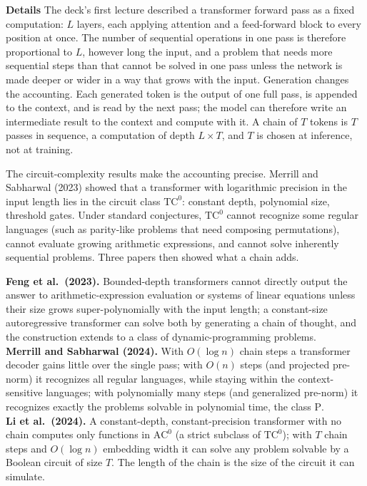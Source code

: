 \documentclass[11pt,letterpaper]{article}
\newcommand{\para}[1]{\medskip\noindent\textbf{#1}\quad}
\newenvironment{formulas}{\begin{tcolorbox}[formulabox]}{\end{tcolorbox}}
\begin{document}
\para{Details} The deck's first lecture described a transformer forward pass as a fixed computation: $L$ layers, each applying attention and a feed-forward block to every position at once. The number of sequential operations in one pass is therefore proportional to $L$, however long the input, and a problem that needs more sequential steps than that cannot be solved in one pass unless the network is made deeper or wider in a way that grows with the input. Generation changes the accounting. Each generated token is the output of one full pass, is appended to the context, and is read by the next pass; the model can therefore write an intermediate result to the context and compute with it. A chain of $T$ tokens is $T$ passes in sequence, a computation of depth $L \times T$, and $T$ is chosen at inference, not at training.

The circuit-complexity results make the accounting precise. Merrill and Sabharwal (2023) showed that a transformer with logarithmic precision in the input length lies in the circuit class $\mathrm{TC}^0$: constant depth, polynomial size, threshold gates. Under standard conjectures, $\mathrm{TC}^0$ cannot recognize some regular languages (such as parity-like problems that need composing permutations), cannot evaluate growing arithmetic expressions, and cannot solve inherently sequential problems. Three papers then showed what a chain adds.

\begin{formulas}
\textbf{Feng et al.\ (2023).} Bounded-depth transformers cannot directly output the answer to arithmetic-expression evaluation or systems of linear equations unless their size grows super-polynomially with the input length; a constant-size autoregressive transformer can solve both by generating a chain of thought, and the construction extends to a class of dynamic-programming problems.\\[3pt]
\textbf{Merrill and Sabharwal (2024).} With $O(\log n)$ chain steps a transformer decoder gains little over the single pass; with $O(n)$ steps (and projected pre-norm) it recognizes all regular languages, while staying within the context-sensitive languages; with polynomially many steps (and generalized pre-norm) it recognizes exactly the problems solvable in polynomial time, the class $\mathrm P$.\\[3pt]
\textbf{Li et al.\ (2024).} A constant-depth, constant-precision transformer with no chain computes only functions in $\mathrm{AC}^0$ (a strict subclass of $\mathrm{TC}^0$); with $T$ chain steps and $O(\log n)$ embedding width it can solve any problem solvable by a Boolean circuit of size $T$. The length of the chain is the size of the circuit it can simulate.
\end{formulas}
\end{document}
